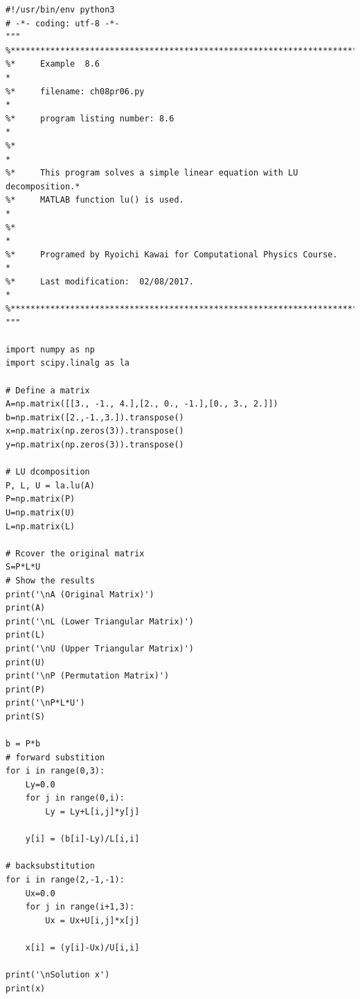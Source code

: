 
\bigskip
\noindent
\program
\footnotesize
\begin{verbatim}
#!/usr/bin/env python3
# -*- coding: utf-8 -*-
"""
%**************************************************************************
%*     Example  8.6                                                       *
%*     filename: ch08pr06.py                                              *
%*     program listing number: 8.6                                        *
%*                                                                        *
%*     This program solves a simple linear equation with LU decomposition.*
%*     MATLAB function lu() is used.                                      *
%*                                                                        *
%*     Programed by Ryoichi Kawai for Computational Physics Course.       *
%*     Last modification:  02/08/2017.                                    *
%**************************************************************************
"""

import numpy as np
import scipy.linalg as la

# Define a matrix
A=np.matrix([[3., -1., 4.],[2., 0., -1.],[0., 3., 2.]])
b=np.matrix([2.,-1.,3.]).transpose()
x=np.matrix(np.zeros(3)).transpose()
y=np.matrix(np.zeros(3)).transpose()

# LU dcomposition
P, L, U = la.lu(A)
P=np.matrix(P)
U=np.matrix(U)
L=np.matrix(L)

# Rcover the original matrix
S=P*L*U
# Show the results
print('\nA (Original Matrix)')
print(A)
print('\nL (Lower Triangular Matrix)')
print(L)
print('\nU (Upper Triangular Matrix)')
print(U)
print('\nP (Permutation Matrix)')
print(P)
print('\nP*L*U')
print(S)

b = P*b
# forward substition
for i in range(0,3):
    Ly=0.0
    for j in range(0,i):
        Ly = Ly+L[i,j]*y[j]

    y[i] = (b[i]-Ly)/L[i,i]

# backsubstitution
for i in range(2,-1,-1):
    Ux=0.0
    for j in range(i+1,3):
        Ux = Ux+U[i,j]*x[j]

    x[i] = (y[i]-Ux)/U[i,i]

print('\nSolution x')
print(x)
\end{verbatim}


